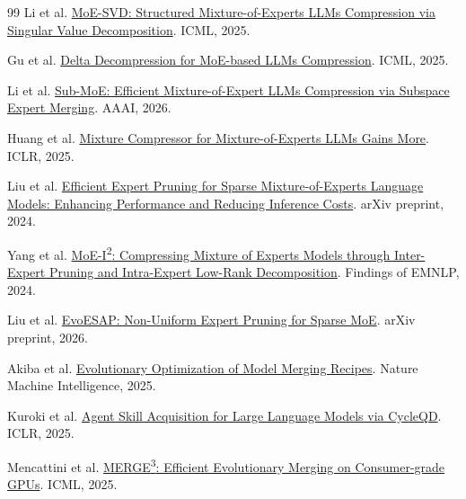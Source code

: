 \documentclass{article}
\begin{document}
\begin{thebibliography}{99}
Li et al. \href{https://proceedings.mlr.press/v267/li25az.html}{MoE-SVD: Structured Mixture-of-Experts LLMs Compression via Singular Value Decomposition}. ICML, 2025.

Gu et al. \href{https://proceedings.mlr.press/v267/gu25c.html}{Delta Decompression for MoE-based LLMs Compression}. ICML, 2025.

Li et al. \href{https://ojs.aaai.org/index.php/AAAI/article/view/39464}{Sub-MoE: Efficient Mixture-of-Expert LLMs Compression via Subspace Expert Merging}. AAAI, 2026.

Huang et al. \href{https://proceedings.iclr.cc/paper_files/paper/2025/hash/abc1943857a42935ceacff03c524bb44-Abstract-Conference.html}{Mixture Compressor for Mixture-of-Experts LLMs Gains More}. ICLR, 2025.

Liu et al. \href{https://arxiv.org/abs/2407.00945}{Efficient Expert Pruning for Sparse Mixture-of-Experts Language Models: Enhancing Performance and Reducing Inference Costs}. arXiv preprint, 2024.

Yang et al. \href{https://aclanthology.org/2024.findings-emnlp.612/}{MoE-I\textsuperscript{2}: Compressing Mixture of Experts Models through Inter-Expert Pruning and Intra-Expert Low-Rank Decomposition}. Findings of EMNLP, 2024.

Liu et al. \href{https://arxiv.org/abs/2603.06003}{EvoESAP: Non-Uniform Expert Pruning for Sparse MoE}. arXiv preprint, 2026.

Akiba et al. \href{https://www.nature.com/articles/s42256-024-00975-8}{Evolutionary Optimization of Model Merging Recipes}. Nature Machine Intelligence, 2025.

Kuroki et al. \href{https://proceedings.iclr.cc/paper_files/paper/2025/hash/755acd0c7c07180d78959b6d89768207-Abstract-Conference.html}{Agent Skill Acquisition for Large Language Models via CycleQD}. ICLR, 2025.

Mencattini et al. \href{https://proceedings.mlr.press/v267/mencattini25a.html}{MERGE\textsuperscript{3}: Efficient Evolutionary Merging on Consumer-grade GPUs}. ICML, 2025.

\end{thebibliography}
\end{document}
